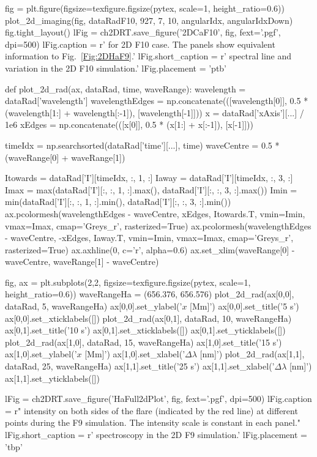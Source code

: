 \begin{pycode}[2DRT]
fig = plt.figure(figsize=texfigure.figsize(pytex, scale=1, height_ratio=0.6))
plot_2d_imaging(fig, dataRadF10, 927, 7, 10, angularIdx, angularIdxDown)
fig.tight_layout()
lFig = ch2DRT.save_figure('2DCaF10', fig, fext='.pgf', dpi=500)
lFig.caption = r'\CaLine{} for 2D F10 case. The panels show equivalent information to Fig.~\ref{Fig:2DHaF9}.'
lFig.short_caption = r'\CaLine{} spectral line and variation in the 2D F10 simulation.'
lFig.placement = 'ptb'
\end{pycode}

\begin{pycode}[2DRT]
def plot_2d_rad(ax, dataRad, time, waveRange):
    wavelength = dataRad['wavelength']
    wavelengthEdges = np.concatenate(([wavelength[0]], 0.5 * (wavelength[1:] + wavelength[:-1]), [wavelength[-1]]))
    x = dataRad['xAxis'][...] / 1e6
    xEdges = np.concatenate(([x[0]], 0.5 * (x[1:] + x[:-1]), [x[-1]]))

    timeIdx = np.searchsorted(dataRad['time'][...], time)
    waveCentre = 0.5 * (waveRange[0] + waveRange[1])

    Itowards = dataRad['I'][timeIdx, :, 1, :]
    Iaway = dataRad['I'][timeIdx, :, 3, :]
    Imax = max(dataRad['I'][:, :, 1, :].max(), dataRad['I'][:, :, 3, :].max())
    Imin = min(dataRad['I'][:, :, 1, :].min(), dataRad['I'][:, :, 3, :].min())
    ax.pcolormesh(wavelengthEdges - waveCentre, xEdges, Itowards.T, vmin=Imin, vmax=Imax, cmap='Greys_r', rasterized=True)
    ax.pcolormesh(wavelengthEdges - waveCentre, -xEdges, Iaway.T, vmin=Imin, vmax=Imax, cmap='Greys_r', rasterized=True)
    ax.axhline(0, c='r', alpha=0.6)
    ax.set_xlim(waveRange[0] - waveCentre, waveRange[1] - waveCentre)

fig, ax = plt.subplots(2,2, figsize=texfigure.figsize(pytex, scale=1, height_ratio=0.6))
waveRangeHa = (656.376, 656.576)
plot_2d_rad(ax[0,0], dataRad, 5, waveRangeHa)
ax[0,0].set_ylabel('$x$ [Mm]')
ax[0,0].set_title('5 s')
ax[0,0].set_xticklabels([])
plot_2d_rad(ax[0,1], dataRad, 10, waveRangeHa)
ax[0,1].set_title('10 s')
ax[0,1].set_xticklabels([])
ax[0,1].set_yticklabels([])
plot_2d_rad(ax[1,0], dataRad, 15, waveRangeHa)
ax[1,0].set_title('15 s')
ax[1,0].set_ylabel('$x$ [Mm]')
ax[1,0].set_xlabel('$\Delta\lambda$ [nm]')
plot_2d_rad(ax[1,1], dataRad, 25, waveRangeHa)
ax[1,1].set_title('25 s')
ax[1,1].set_xlabel('$\Delta\lambda$ [nm]')
ax[1,1].set_yticklabels([])

lFig = ch2DRT.save_figure('HaFull2dPlot', fig, fext='.pgf', dpi=500)
lFig.caption = r"\Ha{} intensity on both sides of the flare (indicated by the red line) at different points during the F9 simulation. The intensity scale is constant in each panel."
lFig.short_caption = r'\Ha{} spectroscopy in the 2D F9 simulation.'
lFig.placement = 'tbp'


\end{pycode}
